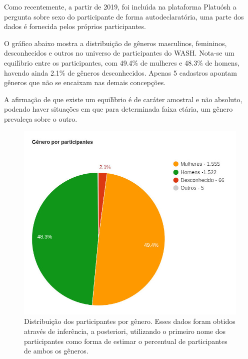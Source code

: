 \documentclass[
12pt,		%
openright,	%
twoside,  %
a4paper,			%
chapter=TITLE,		%
english,			%
french,				%
spanish,			%
brazil				%
]{USPSC-classe/USPSC}
\begin{document}
Como recentemente, a partir de 2019, foi inclu\'{\i}da na plataforma Platu\'osh a pergunta sobre sexo do participante de forma autodeclarat\'oria, uma parte dos dados \'e fornecida pelos pr\'oprios participantes.


O gr\'afico abaixo mostra a distribui\c{c}\~ao de g\^eneros masculinos, femininos, desconhecidos e outros no universo de participantes do WASH. Nota-se um equil\'{\i}brio entre os participantes, com 49.4\% de mulheres e 48.3\% de homens, havendo ainda 2.1\% de g\^eneros desconhecidos. Apenas 5 cadastros apontam g\^eneros que n\~ao se encaixam nas demais concep\c{c}\~oes.


A afirma\c{c}\~ao de que existe um equil\'{\i}brio \'e de car\'ater amostral e n\~ao absoluto, podendo haver situa\c{c}\~oes em que para determinada faixa et\'aria, um g\^enero prevale\c{c}a sobre o outro.




\captionsetup{format=plain}
\begin{figure}[max size={\textwidth}{\textheight}]

\centering


\begin{minipage}[b]{0.4\linewidth}
        \centering
                \includegraphics[width=1.0\linewidth]{../../imagens/genero-todos-crop.jpeg}
                \caption{Distribui\c{c}\~ao dos participantes por g\^enero. Esses dados foram obtidos atrav\'es de infer\^encia, a posteriori, utilizando o primeiro nome dos participantes como forma de estimar o percentual de participantes de ambos os g\^eneros.}
                \label{ef11d820efb73d78fb64eb6bdd03853471a8e89f}
\end{minipage}%
\hspace{0.5cm}
\end{figure}
\end{document}
